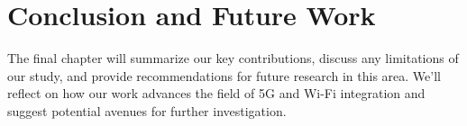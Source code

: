 \chapter{Conclusion and Future Work}%
\label{chapter:conclusion-and-future-work}

\begin{introduction}
The final chapter will summarize our key contributions, discuss any limitations of our study, and provide recommendations for future research in this area. We'll reflect on how our work advances the field of 5G and Wi-Fi integration and suggest potential avenues for further investigation.
\end{introduction}